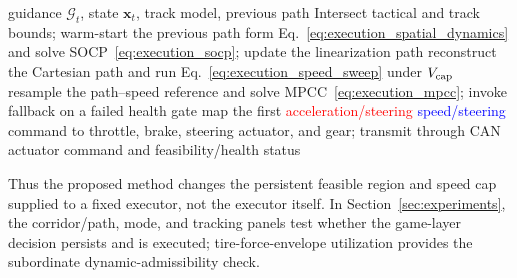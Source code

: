 \begin{algorithm}[!tbp]
\caption{Common corridor-constrained executor}
\label{alg:executor}
\begin{algorithmic}[1]
\REQUIRE guidance $\mathcal G_t$, state $\bm x_t$, track model, previous path
\STATE Intersect tactical and track bounds; warm-start the previous path
  \STATE form Eq.~\eqref{eq:execution_spatial_dynamics} and solve
  SOCP~\eqref{eq:execution_socp}; update the linearization path
\ENDFOR
\STATE reconstruct the Cartesian path and run
Eq.~\eqref{eq:execution_speed_sweep} under $V_{\rm cap}$
\STATE resample the path--speed reference and solve
MPCC~\eqref{eq:execution_mpcc}; invoke fallback on a failed health gate
\STATE map the first
\textcolor{red}{acceleration/steering}
\textcolor{blue}{speed/steering}
command to throttle, brake,
steering actuator, and gear; transmit through CAN
\RETURN actuator command and feasibility/health status
\end{algorithmic}
\end{algorithm}

Thus the proposed method changes the persistent feasible region and speed cap
supplied to a fixed executor, not the executor itself. In
Section~\ref{sec:experiments}, the corridor/path, mode, and tracking panels test
whether the game-layer decision persists and is executed; tire-force-envelope
utilization provides the subordinate dynamic-admissibility check.
